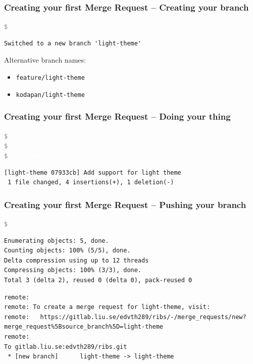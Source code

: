 \documentclass{beamer}
\newcommand{\command}[1]{\colorbox{black!78}{\vphantom{Ep}\texttt{\textcolor{gray}{\$}
\textcolor{white}{#1}}}}
\begin{document}
\begin{frame}[fragile]
  \frametitle{Creating your first Merge Request -- Creating your branch}
  \command{git checkout -b light-theme}
\begin{verbatim}
Switched to a new branch 'light-theme'
\end{verbatim}

\pause{}

Alternative branch names:
\begin{itemize}
  \item \texttt{feature/light-theme}
  \item \texttt{kodapan/light-theme}
\end{itemize}
\end{frame}

\begin{frame}[fragile]
  \frametitle{Creating your first Merge Request -- Doing your thing}
  \command{vim ribs.py}\\
  \command{git add ribs.py}\\
  \command{git commit}
\begin{verbatim}
[light-theme 07933cb] Add support for light theme
 1 file changed, 4 insertions(+), 1 deletion(-)
\end{verbatim}
\end{frame}

\begin{frame}[fragile]
  \frametitle{Creating your first Merge Request -- Pushing your branch}
  \command{git push -u origin light-theme}
\pause
\vspace{-0.6ex}
{
\color{gray}
\begin{Verbatim}[commandchars=\\\{\}]
Enumerating objects: 5, done.
Counting objects: 100% (5/5), done.
Delta compression using up to 12 threads
Compressing objects: 100% (3/3), done.
Total 3 (delta 2), reused 0 (delta 0), pack-reused 0
\end{Verbatim}
}
\vspace{-1.2ex}
\begin{Verbatim}[commandchars=\\\{\}]
remote:
remote: To create a merge request for light-theme, visit:
remote:   https://gitlab.liu.se/edvth289/ribs/-/merge_requests/new?merge_request%5Bsource_branch%5D=light-theme
remote:
To gitlab.liu.se:edvth289/ribs.git
 * [new branch]      light-theme -> light-theme
\end{Verbatim}
\end{frame}
\end{document}
